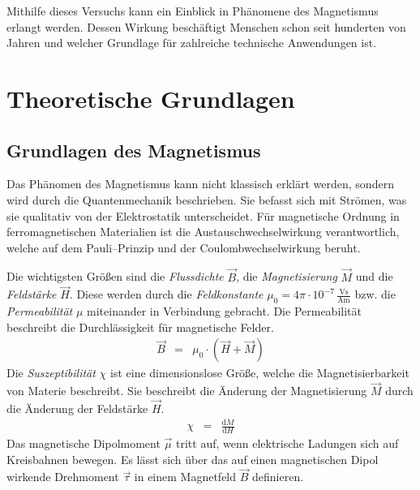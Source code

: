 \documentclass[12pt,a4paper]{scrartcl}
\numberwithin{equation}{section} %
\begin{document}
Mithilfe dieses Versuchs kann ein Einblick in Phänomene des Magnetismus erlangt werden. Dessen Wirkung beschäftigt Menschen schon seit hunderten von Jahren und welcher Grundlage für zahlreiche technische Anwendungen ist.

\clearpage
\hypertarget{theoretische-grundlagen}{%
\section{Theoretische Grundlagen}\label{theoretische-grundlagen}}

\hypertarget{grundlagen-des-magnetismus}{%
\subsection{Grundlagen des Magnetismus}\label{grundlagen-des-magnetismus}}
Das Phänomen des Magnetismus kann nicht klassisch erklärt werden, sondern wird durch die Quantenmechanik beschrieben. Sie befasst sich mit Strömen, was sie qualitativ von der Elektrostatik unterscheidet. Für magnetische Ordnung in ferromagnetischen Materialien ist die Austauschwechselwirkung verantwortlich, welche auf dem Pauli--Prinzip und der Coulombwechselwirkung beruht.

Die wichtigsten Größen sind die \emph{Flussdichte} $\vec B$, die \emph{Magnetisierung} $\vec M$ und die \emph{Feldstärke} $\vec H$. Diese werden durch die \emph{Feldkonstante}
$\mu_0=4\pi\cdot 10^{-7}\mathrm{\,\frac{Vs}{Am}}$ bzw. die \emph{Permeabilität} $\mu$ miteinander in Verbindung gebracht. Die Permeabilität beschreibt die Durchlässigkeit für magnetische Felder. \cite{Jackson}
\begin{eqnarray}
    \vec B &=& \mu_0 \cdot \left(\vec H + \vec M\right) \label{M1}
\end{eqnarray}
Die \emph{Suszeptibilität} $\chi$ ist eine dimensionslose Größe, welche die Magnetisierbarkeit von Materie beschreibt. Sie beschreibt die Änderung der Magnetisierung $\vec M$ durch die Änderung der Feldstärke $\vec H$.
\begin{eqnarray}
    \chi &=& \frac{\mathrm dM}{\mathrm dH} \label{Chi}
\end{eqnarray}
Das magnetische Dipolmoment $\vec \mu$ tritt auf, wenn elektrische Ladungen sich auf Kreisbahnen bewegen. Es lässt sich über das auf einen magnetischen Dipol wirkende Drehmoment $\vec \tau$ in einem Magnetfeld $\vec B$ definieren.
\end{document}
